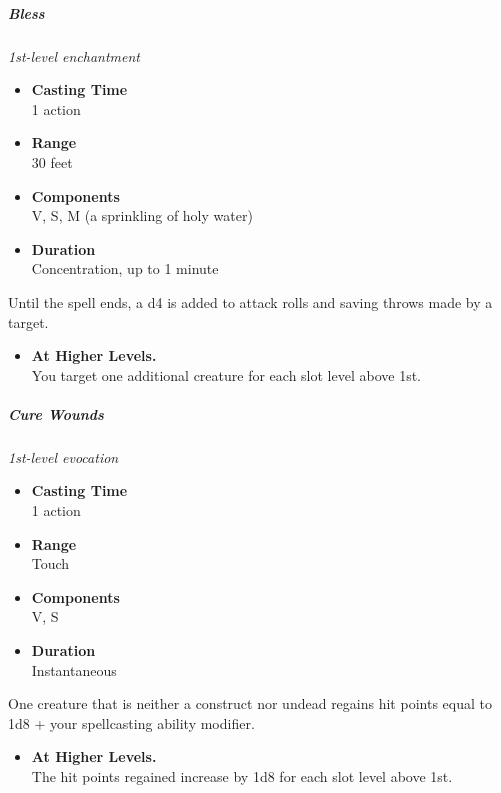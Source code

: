\subparagraph{Bless}\label{Spell_Bless_bless}

\emph{1st-level enchantment}

\begin{itemize}
\item
  \textbf{Casting Time}\\
  1 action
\item
  \textbf{Range}\\
  30 feet
\item
  \textbf{Components}\\
  V, S, M (a sprinkling of holy water)
\item
  \textbf{Duration}\\
  Concentration, up to 1 minute
\end{itemize}

Until the spell ends, a d4 is added to attack rolls and saving throws
made by a target.

\begin{itemize}
\item
  \textbf{At Higher Levels.}\\
  You target one additional creature for each slot level above 1st.
\end{itemize}

\subparagraph{Cure Wounds}\label{Spell_Cure_Wounds_cure-wounds}

\emph{1st-level evocation}

\begin{itemize}
\item
  \textbf{Casting Time}\\
  1 action
\item
  \textbf{Range}\\
  Touch
\item
  \textbf{Components}\\
  V, S
\item
  \textbf{Duration}\\
  Instantaneous
\end{itemize}

One creature that is neither a construct nor undead regains hit points
equal to 1d8 + your spellcasting ability modifier.

\begin{itemize}
\item
  \textbf{At Higher Levels.}\\
  The hit points regained increase by 1d8 for each slot level above 1st.
\end{itemize}

